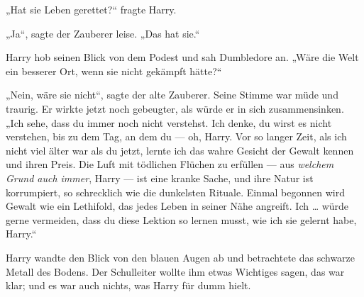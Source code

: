 „Hat sie Leben gerettet?“ fragte Harry.

„Ja“, sagte der Zauberer leise.
„Das hat sie.“

Harry hob seinen Blick von dem Podest und sah Dumbledore an.
„Wäre die Welt ein besserer Ort, wenn sie nicht gekämpft hätte?“

„Nein, wäre sie nicht“, sagte der alte Zauberer. Seine Stimme war müde und traurig. Er wirkte jetzt noch gebeugter, als würde er in sich zusammensinken.
„Ich sehe, dass du immer noch nicht verstehst. Ich denke, du wirst es nicht verstehen, bis zu dem Tag, an dem du — oh, Harry. Vor so langer Zeit, als ich nicht viel älter war als du jetzt, lernte ich das wahre Gesicht der Gewalt kennen und ihren Preis. Die Luft mit tödlichen Flüchen zu erfüllen — aus \emph{welchem Grund auch immer}, Harry — ist eine kranke Sache, und ihre Natur ist korrumpiert, so schrecklich wie die dunkelsten Rituale. Einmal begonnen wird Gewalt wie ein Lethifold, das jedes Leben in seiner Nähe angreift. Ich … würde gerne vermeiden, dass du diese Lektion so lernen musst, wie ich sie gelernt habe, Harry.“

Harry wandte den Blick von den blauen Augen ab und betrachtete das schwarze Metall des Bodens. Der Schulleiter wollte ihm etwas Wichtiges sagen, das war klar; und es war auch nichts, was Harry für dumm hielt.

